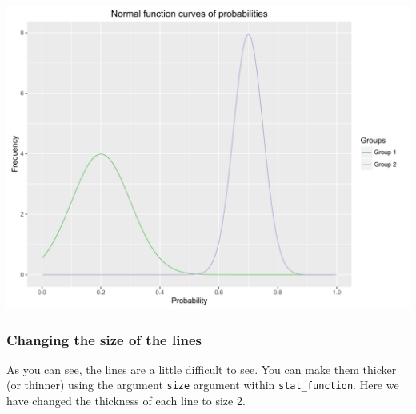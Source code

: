 \documentclass[]{article}
\begin{document}
\begin{center}\includegraphics{0_all_posts_pdf/function_11-1} \end{center}

\subsubsection{Changing the size of the
lines}\label{changing-the-size-of-the-lines}

As you can see, the lines are a little difficult to see. You can make
them thicker (or thinner) using the argument \texttt{size} argument
within \texttt{stat\_function}. Here we have changed the thickness of
each line to size 2.
\end{document}
